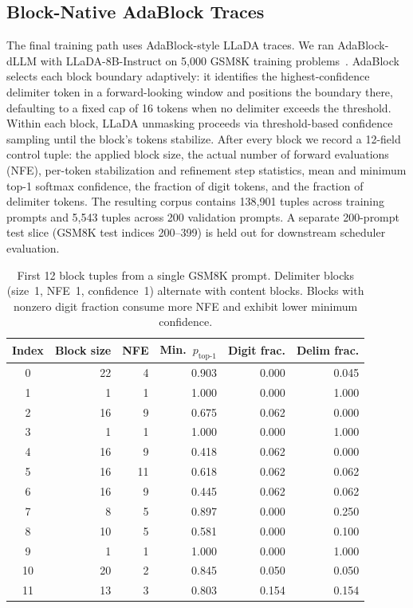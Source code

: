 \documentclass[11pt]{article}
\begin{document}
\subsection{Block-Native AdaBlock Traces}

The final training path uses AdaBlock-style LLaDA traces. We ran AdaBlock-dLLM with LLaDA-8B-Instruct on 5{,}000 GSM8K training problems~\citep{cobbe2021gsm8k}. AdaBlock selects each block boundary adaptively: it identifies the highest-confidence delimiter token in a forward-looking window and positions the boundary there, defaulting to a fixed cap of 16 tokens when no delimiter exceeds the threshold. Within each block, LLaDA unmasking proceeds via threshold-based confidence sampling until the block's tokens stabilize. After every block we record a 12-field control tuple: the applied block size, the actual number of forward evaluations (NFE), per-token stabilization and refinement step statistics, mean and minimum top-1 softmax confidence, the fraction of digit tokens, and the fraction of delimiter tokens. The resulting corpus contains 138{,}901 tuples across training prompts and 5{,}543 tuples across 200 validation prompts. A separate 200-prompt test slice (GSM8K test indices 200--399) is held out for downstream scheduler evaluation.

\begin{table}[t!]
  \centering
  \caption{First 12 block tuples from a single GSM8K prompt. Delimiter blocks (size~1, NFE~1, confidence~1) alternate with content blocks. Blocks with nonzero digit fraction consume more NFE and exhibit lower minimum confidence.}
  \label{tab:sample-trace}
  \footnotesize
  \begin{tabular}{@{}crrrrr@{}}
    \toprule
    Index & Block size & NFE & Min.\ $p_{\text{top-1}}$ & Digit frac. & Delim frac. \\
    \midrule
     0 & 22 &  4 & 0.903 & 0.000 & 0.045 \\
     1 &  1 &  1 & 1.000 & 0.000 & 1.000 \\
     2 & 16 &  9 & 0.675 & 0.062 & 0.000 \\
     3 &  1 &  1 & 1.000 & 0.000 & 1.000 \\
     4 & 16 &  9 & 0.418 & 0.062 & 0.000 \\
     5 & 16 & 11 & 0.618 & 0.062 & 0.062 \\
     6 & 16 &  9 & 0.445 & 0.062 & 0.062 \\
     7 &  8 &  5 & 0.897 & 0.000 & 0.250 \\
     8 & 10 &  5 & 0.581 & 0.000 & 0.100 \\
     9 &  1 &  1 & 1.000 & 0.000 & 1.000 \\
    10 & 20 &  2 & 0.845 & 0.050 & 0.050 \\
    11 & 13 &  3 & 0.803 & 0.154 & 0.154 \\
    \bottomrule
  \end{tabular}
\end{table}
\end{document}
